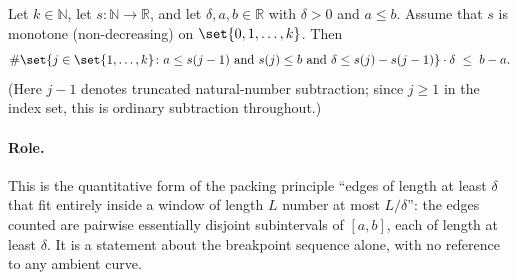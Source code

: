 \begin{helper}
  Let $k \in \mathbb{N}$, let $s \colon \mathbb{N} \to \mathbb{R}$, and let
  $\delta, a, b \in \mathbb{R}$ with $\delta > 0$ and $a \le b$. Assume that $s$ is monotone
  (non-decreasing) on $\set{0,1,\dots,k}$. Then
  \[
    \#\set{ j \in \set{1,\dots,k} \colon a \le s(j-1) \text{ and } s(j) \le b \text{ and }
      \delta \le s(j) - s(j-1) } \cdot \delta \;\le\; b - a
    .
  \]
  (Here $j-1$ denotes truncated natural-number subtraction; since $j \ge 1$ in the index set, this
  is ordinary subtraction throughout.)

  \paragraph{Role.} This is the quantitative form of the packing principle ``edges of length at
  least $\delta$ that fit entirely inside a window of length $L$ number at most $L/\delta$'': the
  edges counted are pairwise essentially disjoint subintervals of $[a,b]$, each of length at least
  $\delta$. It is a statement about the breakpoint sequence alone, with no reference to any
  ambient curve.
\end{helper}
